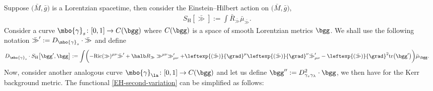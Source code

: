 Suppose $\bigl(\bar{M}, \bar{g}\bigr)$ is a Lorentzian spacetime, then consider the Einstein--Hilbert action on $\bigl(\bar{M}, \bar{g}\bigr)$,
\begin{align*}
S_{\text{H}}[\bar{\gg}] := \int \bar{R}_{\bar{\gg}} \bar{\mu}_{\bar{\gg}}.
\end{align*}
Consider a curve $\mbo{\gamma}_s \colon [0,1] \to C(\bgg)$ where $C(\bgg)$ is a space of smooth Lorentzian metrics $\bgg$. We shall use the following notation $ \bar{\gg}' := D_{\mbo{\gamma}_s} \cdot \bar{\gg}$ and define
\begin{align*}
D_{\mbo{\gamma}_s} \cdot S_{\text{H}} \bigl[\bgg', \bgg\bigr] := \int \biggl( -\text{Ric}(\gg)^{\mu \nu} \bar{\gg}' + \halb R_\gg \gg^{\mu \nu} \gg'_{\mu \nu} + \leftexp{(\bar{\gg})}{\grad}^\mu \leftexp{(\bar{\gg})}{\grad}^\nu \bar{\gg}'_{\mu \nu} - \leftexp{(\bar{\gg})}{\grad}^2 {\rm tr}\bigl(\bgg'\bigr) \biggr) \bar{\mu}_\bgg.
\end{align*}
Now, consider another analogous curve $\mbo{\gamma}_\la \colon [0, 1] \to C (\bgg)$ and let us define $ \bgg'' := D^2_{\gamma_s \gamma_\lambda} \cdot \bgg $, we then have for the Kerr background metric. The functional \eqref{EH-second-variation} can be simplified as follows:
